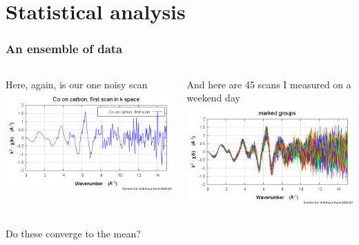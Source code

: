 \documentclass[10pt, xcolor=x11names, compress]{beamer}
\begin{document}
\section{Statistical analysis}

\begin{frame}
  \frametitle{An ensemble of data}
  \begin{columns}[T]
    \begin{column}{0.5\linewidth}
      \centering Here, again, is our one noisy scan\\
      \includegraphics[width=\linewidth]{images/firstscan.png}
    \end{column}
    \begin{column}{0.5\linewidth}
      \centering And here are 45 scans I measured on a weekend day\\
      \includegraphics[width=\linewidth]{images/manyscans.png}
    \end{column}
  \end{columns}
  \begin{block}{}
    \centering Do these converge to the mean?
  \end{block}
\end{frame}
\end{document}
